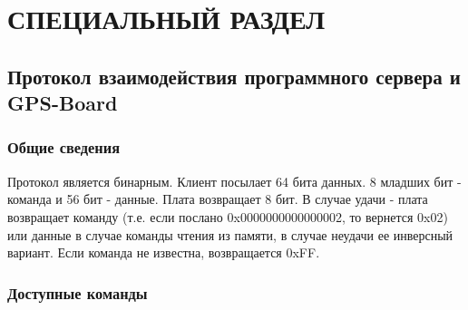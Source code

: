 \section{СПЕЦИАЛЬНЫЙ РАЗДЕЛ}

\subsection{Протокол взаимодействия программного сервера и GPS-Board}
\label{sec:binary_protocol}
\subsubsection{Общие сведения}
Протокол является бинарным. Клиент посылает 64 бита данных. 8 младших бит - команда и 56 бит - данные. Плата возвращает 8 бит. В случае
удачи - плата возвращает команду (т.е. если послано 0x0000000000000002, то вернется 0x02) или данные в случае команды чтения из
памяти, в случае неудачи ее инверсный вариант. Если команда не известна, возвращается 0xFF.

\subsubsection{Доступные команды}

